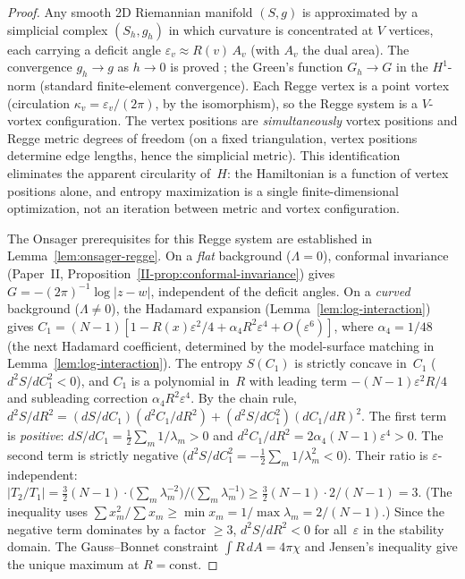 \begin{proof}
Any smooth 2D Riemannian manifold $(S, g)$ is
approximated by a simplicial complex $(S_h, g_h)$
in which curvature is concentrated at $V$ vertices,
each carrying a deficit angle
$\varepsilon_v \approx R(v)\,A_v$
(with $A_v$ the dual area).
The convergence $g_h \to g$ as $h \to 0$ is proved
\citep{CheegerMullerSchrader1984}; the Green's function
$G_h \to G$ in the $H^1$-norm (standard finite-element
convergence).
Each Regge vertex is a point vortex
(circulation $\kappa_v = \varepsilon_v/(2\pi)$,
by the isomorphism), so the Regge system is a
$V$-vortex configuration.
The vertex positions are \emph{simultaneously}
vortex positions and Regge metric degrees of freedom
(on a fixed triangulation, vertex positions determine
edge lengths, hence the simplicial metric).
This identification eliminates the apparent circularity
of~$H$: the Hamiltonian is a function of vertex positions
alone, and entropy maximization is a single finite-dimensional
optimization, not an iteration between metric and
vortex configuration.

The Onsager prerequisites for this Regge system
are established in Lemma~\ref{lem:onsager-regge}.
On a \emph{flat} background ($\Lambda = 0$),
conformal invariance
(Paper~II, Proposition~\ref{II-prop:conformal-invariance})
gives $G = -(2\pi)^{-1}\log|z{-}w|$,
independent of the deficit angles.
On a \emph{curved} background ($\Lambda \ne 0$),
the Hadamard expansion (Lemma~\ref{lem:log-interaction}) gives
$C_1 = (N{-}1)[1 - R(x)\varepsilon^2/4
+ \alpha_4 R^2\varepsilon^4 + O(\varepsilon^6)]$,
where $\alpha_4 = 1/48$ (the next Hadamard coefficient,
determined by the model-surface matching in
Lemma~\ref{lem:log-interaction}).
The entropy $S(C_1)$ is strictly concave in~$C_1$
($d^2S/dC_1^2 < 0$), and $C_1$ is a polynomial in~$R$
with leading term $-(N{-}1)\varepsilon^2 R/4$
and subleading correction $\alpha_4 R^2\varepsilon^4$.
By the chain rule, $d^2S/dR^2 = (dS/dC_1)(d^2C_1/dR^2)
+ (d^2S/dC_1^2)(dC_1/dR)^2$.
The first term is \emph{positive}:
$dS/dC_1 = \tfrac{1}{2}\sum_m 1/\lambda_m > 0$ and
$d^2C_1/dR^2 = 2\alpha_4(N{-}1)\varepsilon^4 > 0$.
The second term is strictly negative
($d^2S/dC_1^2 = -\tfrac{1}{2}\sum_m 1/\lambda_m^2 < 0$).
Their ratio is $\varepsilon$-independent:
$|T_2/T_1| = \tfrac{3}{2}(N{-}1)
\cdot \bigl(\sum_m \lambda_m^{-2}\bigr)/\!\bigl(\sum_m \lambda_m^{-1}\bigr)
\ge \tfrac{3}{2}(N{-}1) \cdot 2/(N{-}1) = 3$.
(The inequality uses
$\sum x_m^2/\!\sum x_m \ge \min x_m = 1/\!\max \lambda_m
= 2/(N{-}1)$.)
Since the negative term dominates by a factor $\ge 3$,
$d^2S/dR^2 < 0$ for all~$\varepsilon$ in the stability domain.
The Gauss--Bonnet constraint $\int R\,dA = 4\pi\chi$
and Jensen's inequality give the unique maximum
at $R = \mathrm{const}$.


\end{proof}

